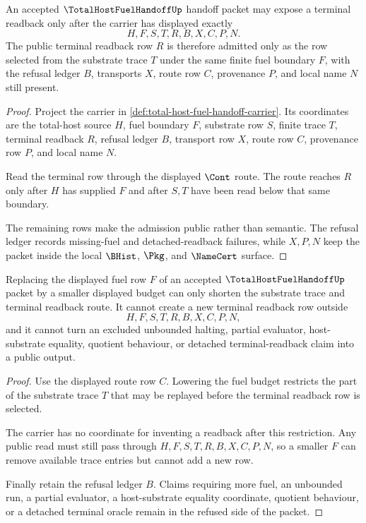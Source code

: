 \begin{theorem}
\label{thm:total-host-fuel-handoff-carrier-admission}
An accepted $\TotalHostFuelHandoffUp$ handoff packet may expose a terminal readback only after the carrier has displayed exactly
$$
H,F,S,T,R,B,X,C,P,N.
$$
The public terminal readback row $R$ is therefore admitted only as the row selected from the substrate trace $T$ under the same finite fuel boundary $F$, with the refusal ledger $B$, transports $X$, route row $C$, provenance $P$, and local name $N$ still present.
\end{theorem}
\begin{proof}
Project the carrier in \autoref{def:total-host-fuel-handoff-carrier}. Its coordinates are the total-host source $H$, fuel boundary $F$, substrate row $S$, finite trace $T$, terminal readback $R$, refusal ledger $B$, transport row $X$, route row $C$, provenance row $P$, and local name $N$.

Read the terminal row through the displayed $\Cont$ route. The route reaches $R$ only after $H$ has supplied $F$ and after $S,T$ have been read below that same boundary.

The remaining rows make the admission public rather than semantic. The refusal ledger records missing-fuel and detached-readback failures, while $X,P,N$ keep the packet inside the local $\BHist$, $\Pkg$, and $\NameCert$ surface.
\end{proof}

\begin{theorem}
\label{thm:total-host-fuel-handoff-fuel-monotonicity}
Replacing the displayed fuel row $F$ of an accepted $\TotalHostFuelHandoffUp$ packet by a smaller displayed budget can only shorten the substrate trace and terminal readback route. It cannot create a new terminal readback row outside
$$
H,F,S,T,R,B,X,C,P,N,
$$
and it cannot turn an excluded unbounded halting, partial evaluator, host-substrate equality, quotient behaviour, or detached terminal-readback claim into a public output.
\end{theorem}
\begin{proof}
Use the displayed route row $C$. Lowering the fuel budget restricts the part of the substrate trace $T$ that may be replayed before the terminal readback row is selected.

The carrier has no coordinate for inventing a readback after this restriction. Any public read must still pass through $H,F,S,T,R,B,X,C,P,N$, so a smaller $F$ can remove available trace entries but cannot add a new row.

Finally retain the refusal ledger $B$. Claims requiring more fuel, an unbounded run, a partial evaluator, a host-substrate equality coordinate, quotient behaviour, or a detached terminal oracle remain in the refused side of the packet.
\end{proof}

